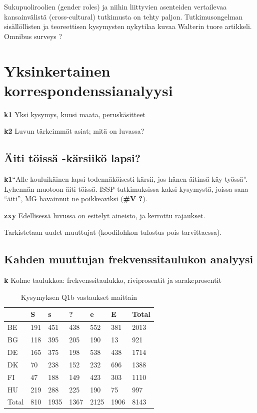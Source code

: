 \documentclass[
  finnish,
]{book}
\begin{document}
Sukupuoliroolien (gender roles) ja niihin liittyvien asenteiden vertailevaa kansainvälistä (cross-cultural) tutkimusta on tehty paljon. Tutkimusongelman sisällöllisten ja teoreettisen kysymysten nykytilaa kuvaa Walterin\citep{RefWorks:doc:5bd08fb6e4b05c5447c9a9f9} tuore artikkeli. Omnibus surveys ?

\hypertarget{yksinkertainen-korrespondenssianalyysi}{%
\chapter{Yksinkertainen korrespondenssianalyysi}\label{yksinkertainen-korrespondenssianalyysi}}

\textbf{k1} Yksi kysymys, kuusi maata, peruskäsitteet

\textbf{k2} Luvun tärkeimmät asiat; mitä on luvassa?

\hypertarget{uxe4iti-tuxf6issuxe4--kuxe4rsiikuxf6-lapsi}{%
\section{Äiti töissä -kärsiikö lapsi?}\label{uxe4iti-tuxf6issuxe4--kuxe4rsiikuxf6-lapsi}}

\textbf{k1}``Alle kouluikäinen lapsi todennäköisesti kärsii, jos hänen äitinsä käy työssä''.
Lyhennän muotoon äiti töissä. ISSP-tutkimuksissa kaksi kysymystä, joissa sana ``äiti'',
MG havainnut ne poikkeaviksi (\textbf{\#V ?}).

\textbf{zxy} Edellisessä luvussa on esitelyt aineisto, ja kerrottu rajaukset.

Tarkistetaan uudet muuttujat (koodilohkon tulostus pois tarvittaessa).

\hypertarget{kahden-muuttujan-frekvenssitaulukon-analyysi}{%
\section{Kahden muuttujan frekvenssitaulukon analyysi}\label{kahden-muuttujan-frekvenssitaulukon-analyysi}}

\textbf{k} Kolme taulukkoa: frekvenssitaulukko, riviprosentit ja sarakeprosentit

\begin{table}

\caption{\label{tab:simpeCA-frekTa1}Kysymyksen Q1b vastaukset maittain}
\centering
\begin{tabular}[t]{lllllll}
\toprule
  & S & s & ? & e & E & Total\\
\midrule
BE & 191 & 451 & 438 & 552 & 381 & 2013\\
BG & 118 & 395 & 205 & 190 & 13 & 921\\
DE & 165 & 375 & 198 & 538 & 438 & 1714\\
DK & 70 & 238 & 152 & 232 & 696 & 1388\\
FI & 47 & 188 & 149 & 423 & 303 & 1110\\
\addlinespace
HU & 219 & 288 & 225 & 190 & 75 & 997\\
Total & 810 & 1935 & 1367 & 2125 & 1906 & 8143\\
\bottomrule
\end{tabular}
\end{table}
\end{document}
